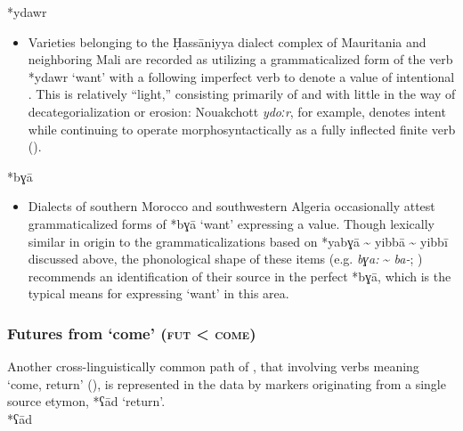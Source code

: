 \documentclass[output=paper]{langsci/langscibook}
\begin{document}
*ydawr

\begin{itemize}

  \item[]
Varieties belonging to the Ḥassāniyya dialect complex of Mauritania and neighboring Mali are recorded as utilizing a grammaticalized form of the verb *ydawr ‘want’ with a following imperfect verb to denote a value of intentional . This  is relatively “light,” consisting primarily of  and  with little in the way of decategorialization or erosion: Nouakchott \textit{ydoːr}, for example, denotes  intent while continuing to operate morphosyntactically as a fully inflected finite verb (\citealt{Taine-Cheikh2011hass}).
\end{itemize}
 
*bɣā

\begin{itemize}

  \item[]
Dialects of southern Morocco and southwestern Algeria occasionally attest grammaticalized forms of *bɣā ‘want’ expressing a   value. Though lexically similar in origin to the grammaticalizations based on *yabɣā {\textasciitilde} yibbā {\textasciitilde} yibbī discussed above, the phonological shape of these items (e.g.  \textit{bɣa:} {\textasciitilde} \textit{ba-}; \citealt{Sánchez2014}) recommends an identification of their source in the perfect  *bɣā, which is the typical means for expressing ‘want’ in this area.
\end{itemize}

\subsubsection{ Futures from ‘come’ (\textsc{fut} < \textsc{come})}

Another cross-linguistically common path of   , that involving verbs meaning ‘come, return’ (\citealt{Bybee1994,HeineKuteva2002}), is represented in the  data by markers originating from a single source etymon, *ʕād ‘return’.\\
 
*ʕād
\end{document}
